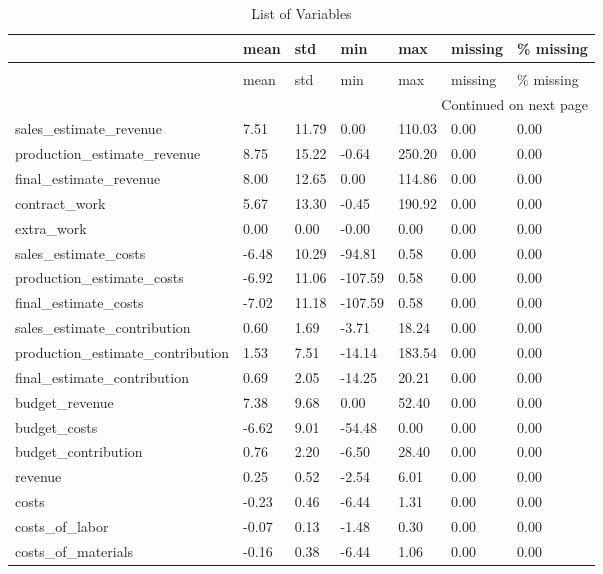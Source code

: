 \begin{landscape}\begin{longtable}[h!]{lllllll}
\caption{List of Variables} \label{eda_1} \\
\toprule
 & mean & std & min & max & missing & \% missing \\
\midrule
\endfirsthead
\caption[]{List of Variables} \\
\toprule
 & mean & std & min & max & missing & \% missing \\
\midrule
\endhead
\midrule
\multicolumn{7}{r}{Continued on next page} \\
\midrule
\endfoot
\bottomrule
\endlastfoot
sales_estimate_revenue & 7.51 & 11.79 & 0.00 & 110.03 & 0.00 & 0.00 \\
production_estimate_revenue & 8.75 & 15.22 & -0.64 & 250.20 & 0.00 & 0.00 \\
final_estimate_revenue & 8.00 & 12.65 & 0.00 & 114.86 & 0.00 & 0.00 \\
contract_work & 5.67 & 13.30 & -0.45 & 190.92 & 0.00 & 0.00 \\
extra_work & 0.00 & 0.00 & -0.00 & 0.00 & 0.00 & 0.00 \\
sales_estimate_costs & -6.48 & 10.29 & -94.81 & 0.58 & 0.00 & 0.00 \\
production_estimate_costs & -6.92 & 11.06 & -107.59 & 0.58 & 0.00 & 0.00 \\
final_estimate_costs & -7.02 & 11.18 & -107.59 & 0.58 & 0.00 & 0.00 \\
sales_estimate_contribution & 0.60 & 1.69 & -3.71 & 18.24 & 0.00 & 0.00 \\
production_estimate_contribution & 1.53 & 7.51 & -14.14 & 183.54 & 0.00 & 0.00 \\
final_estimate_contribution & 0.69 & 2.05 & -14.25 & 20.21 & 0.00 & 0.00 \\
budget_revenue & 7.38 & 9.68 & 0.00 & 52.40 & 0.00 & 0.00 \\
budget_costs & -6.62 & 9.01 & -54.48 & 0.00 & 0.00 & 0.00 \\
budget_contribution & 0.76 & 2.20 & -6.50 & 28.40 & 0.00 & 0.00 \\
revenue & 0.25 & 0.52 & -2.54 & 6.01 & 0.00 & 0.00 \\
costs & -0.23 & 0.46 & -6.44 & 1.31 & 0.00 & 0.00 \\
costs_of_labor & -0.07 & 0.13 & -1.48 & 0.30 & 0.00 & 0.00 \\
costs_of_materials & -0.16 & 0.38 & -6.44 & 1.06 & 0.00 & 0.00 \\

\end{longtable}
\end{landscape}
